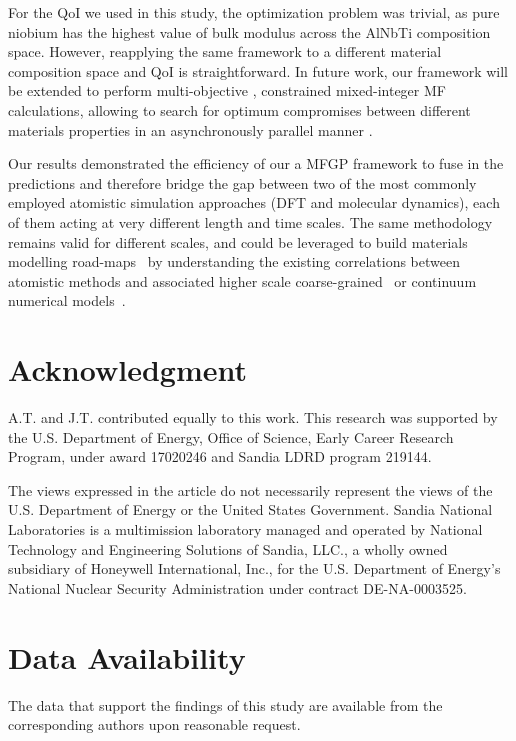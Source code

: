 \documentclass[%
 reprint,
aip,jcp
]{revtex4-1}
\begin{document}
For the QoI we used in this study, the optimization problem 
was trivial, as pure niobium has the highest value of bulk modulus
across the AlNbTi composition space.
However, reapplying the same framework to a different material 
composition space and QoI is straightforward. 
In future work, our framework will be extended to perform 
multi-objective \cite{tran2020srmobo3gp,shu2020new},  
constrained mixed-integer \cite{tran2019constrained} MF calculations,
allowing to  search for optimum compromises between different materials
properties in an asynchronously parallel manner
\cite{tran2019pbo,tran2020an}. 

Our results demonstrated the efficiency of our a MFGP framework to fuse in 
the predictions and therefore bridge the gap between two of the most commonly
employed atomistic simulation approaches (DFT and molecular dynamics), each 
of them acting at very different length and time scales. 
The same methodology remains valid for different scales, and could be 
leveraged to build materials modelling 
road-maps~\cite{van2020roadmap} by understanding the 
existing correlations between atomistic methods
\cite{bulatov1998connecting,tranchida2018massively,zepeda2017probing}
and associated higher scale coarse-grained~\cite{tranchida2018hierarchies} or continuum numerical models~\cite{arsenlis2007enabling,roters2010overview}.

\section*{Acknowledgment}

A.T. and J.T. contributed equally to this work. 
This research was supported by the U.S. Department of Energy, Office 
of Science, Early Career Research Program, under award 17020246 
and Sandia LDRD program 219144. 

The views expressed in the article do not necessarily represent the 
views of the U.S. Department of Energy or the United States Government. 
Sandia National Laboratories is a multimission laboratory managed and 
operated by National Technology and Engineering Solutions of Sandia, 
LLC., a wholly owned subsidiary of Honeywell International, Inc., 
for the U.S. Department of Energy's National Nuclear Security 
Administration under contract DE-NA-0003525. 

\section*{Data Availability}

The data that support the findings of this study are available
from the corresponding authors upon reasonable request.




\end{document}
